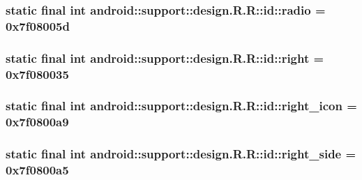 \hypertarget{classandroid_1_1support_1_1design_1_1_r_1_1id_1831a97bb760cdfa1c59bf05848c2a48}{
\subsubsection[{radio}]{\setlength{\rightskip}{0pt plus 5cm}static final int android::support::design.R.R::id::radio = 0x7f08005d}}
\label{classandroid_1_1support_1_1design_1_1_r_1_1id_1831a97bb760cdfa1c59bf05848c2a48}


\hypertarget{classandroid_1_1support_1_1design_1_1_r_1_1id_ce3625d715fa2f039a5afa55922d1df1}{
\subsubsection[{right}]{\setlength{\rightskip}{0pt plus 5cm}static final int android::support::design.R.R::id::right = 0x7f080035}}
\label{classandroid_1_1support_1_1design_1_1_r_1_1id_ce3625d715fa2f039a5afa55922d1df1}


\hypertarget{classandroid_1_1support_1_1design_1_1_r_1_1id_e02942ad883d1f066cadd1646c38bd97}{
\subsubsection[{right\_\-icon}]{\setlength{\rightskip}{0pt plus 5cm}static final int android::support::design.R.R::id::right\_\-icon = 0x7f0800a9}}
\label{classandroid_1_1support_1_1design_1_1_r_1_1id_e02942ad883d1f066cadd1646c38bd97}


\hypertarget{classandroid_1_1support_1_1design_1_1_r_1_1id_fe521233fe4f5494e93013724e569021}{
\subsubsection[{right\_\-side}]{\setlength{\rightskip}{0pt plus 5cm}static final int android::support::design.R.R::id::right\_\-side = 0x7f0800a5}}
\label{classandroid_1_1support_1_1design_1_1_r_1_1id_fe521233fe4f5494e93013724e569021}


